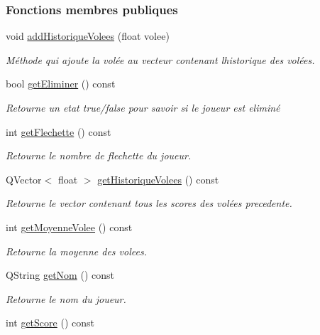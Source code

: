 \subsubsection*{Fonctions membres publiques}
\begin{DoxyCompactItemize}
\item 
void \hyperlink{class_joueur_a219d4e16e9396f56d73485b038fc2d8f}{add\+Historique\+Volees} (float volee)
\begin{DoxyCompactList}\small\item\em Méthode qui ajoute la volée au vecteur contenant l\textquotesingle{}historique des volées. \end{DoxyCompactList}\item 
bool \hyperlink{class_joueur_abb5b33a4782973be4f5b238385c94cac}{get\+Eliminer} () const
\begin{DoxyCompactList}\small\item\em Retourne un etat true/false pour savoir si le joueur est eliminé \end{DoxyCompactList}\item 
int \hyperlink{class_joueur_a6a9730a4653b10e507c32715920bdea5}{get\+Flechette} () const
\begin{DoxyCompactList}\small\item\em Retourne le nombre de flechette du joueur. \end{DoxyCompactList}\item 
Q\+Vector$<$ float $>$ \hyperlink{class_joueur_a2f99a607d1806aae8361bbff086947f1}{get\+Historique\+Volees} () const
\begin{DoxyCompactList}\small\item\em Retourne le vector contenant tous les scores des volées precedente. \end{DoxyCompactList}\item 
int \hyperlink{class_joueur_ace9bf081d3f518eaed93b53153efcf19}{get\+Moyenne\+Volee} () const
\begin{DoxyCompactList}\small\item\em Retourne la moyenne des volees. \end{DoxyCompactList}\item 
Q\+String \hyperlink{class_joueur_a1d7082ab1f926eae1bd6834e901751a7}{get\+Nom} () const
\begin{DoxyCompactList}\small\item\em Retourne le nom du joueur. \end{DoxyCompactList}\item 
int \hyperlink{class_joueur_adf4397ffb7fcc340c2d2cc6c45edc8e2}{get\+Score} () const

\end{DoxyCompactItemize}
